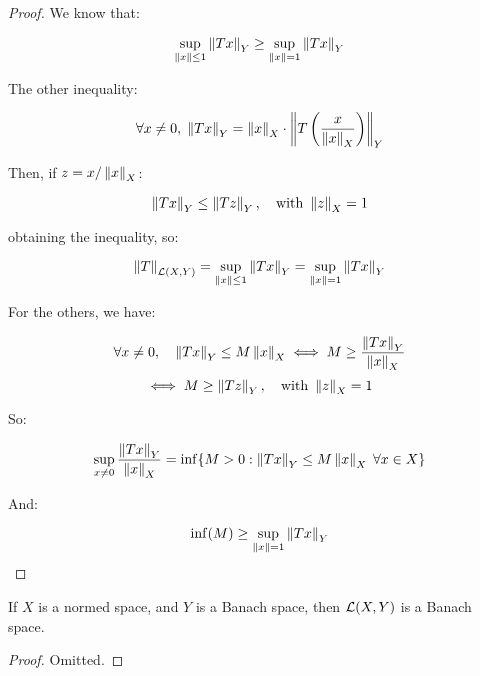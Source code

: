 \begin{proof}
    We know that:

    $$\sup_{\left\|x\right\| \leq 1} \left\|Tx\right\|_Y \geq \sup_{\left\|x\right\|=1} \left\|Tx\right\|_Y$$

    The other inequality:

    $$\forall x \neq 0, \; \left\|Tx\right\|_Y = \left\|x\right\|_X \cdot \left\|T\left(\frac{x}{\left\|x\right\|_X}\right)\right\|_Y$$

    Then, if $z= x / \left\|x\right\|_X$:

    $$\left\|Tx\right\|_Y \leq \left\|Tz\right\|_Y, \quad \text{with } \left\|z\right\|_X = 1$$

    obtaining the inequality, so:

    $$\left\|T\right\|_{\mathcal{L}(X, Y)} = \sup_{\left\|x\right\|\leq1} \left\|Tx\right\|_Y = 
    \sup_{\left\|x\right\|=1} \left\|Tx\right\|_Y$$

    For the others, we have:

    $$\forall x \neq 0, \quad \left\|Tx\right\|_Y \leq M \left\|x\right\|_X \iff M \geq \frac{\left\|Tx\right\|_Y}{\left\|x\right\|_X}$$
    $$\iff M \geq \left\|Tz\right\|_Y, \quad \text{with } \left\|z\right\|_X = 1$$

    So:

    $$\sup_{x \neq 0} \frac{\left\|Tx\right\|_Y}{\left\|x\right\|_X} = 
    \inf \{M > 0: \left\|Tx\right\|_Y \leq M \left\|x\right\|_X \; \forall x \in X\}$$

    And:

    $$\inf(M) \geq \sup_{\left\|x\right\| = 1} \left\|Tx\right\|_Y$$

\end{proof}

\begin{ftheorem}
    If $X$ is a normed space, and $Y$ is a Banach space, 
    then $\mathcal{L}(X, Y)$ is a Banach space.
\end{ftheorem}

\begin{proof}
    Omitted.
\end{proof}

